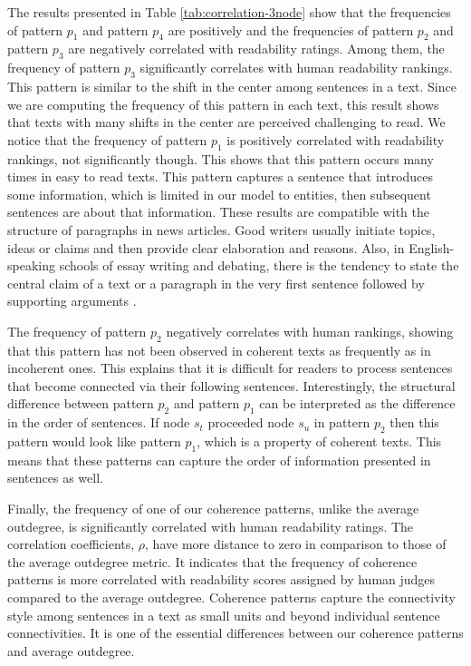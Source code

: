 The results presented in Table \ref{tab:correlation-3node} show that the frequencies of pattern $p_1$ and pattern $p_4$ are positively and the frequencies of pattern $p_2$ and pattern $p_3$ are negatively correlated with readability ratings. 
Among them, the frequency of pattern $p_3$ significantly correlates with human readability rankings. 
This pattern is similar to the shift in the center among sentences in a text. 
Since we are computing the frequency of this pattern in each text, this result shows that texts with many shifts in the center are perceived challenging to read. 
We notice that the frequency of pattern $p_1$ is positively correlated with readability rankings, not significantly though. 
This shows that this pattern occurs many times in easy to read texts.  
This pattern captures a sentence that introduces some information, which is limited in our model to entities, then subsequent sentences are about that information. 
These results are compatible with the structure of paragraphs in news articles. 
Good writers usually initiate topics, ideas or claims and then provide clear elaboration and reasons. 
Also, in English-speaking schools of essay writing and debating, there is the tendency to state the central claim of a text or a paragraph in the very first sentence followed by supporting arguments \cite{peldszus15}. 

The frequency of pattern $p_2$ negatively correlates with human rankings, showing that this pattern has not been observed in coherent texts as frequently as in incoherent ones. 
This explains that it is difficult for readers to process sentences that become connected via their following sentences.  
Interestingly, the structural difference between pattern $p_2$ and pattern $p_1$ can be interpreted as the difference in the order of sentences. 
If node $s_t$ proceeded node $s_u$ in pattern $p_2$ then this pattern would look like pattern $p_1$, which is a property of coherent texts. 
This means that these patterns can capture the order of information presented in sentences as well. 

Finally, the frequency of one of our coherence patterns, unlike the average outdegree, is significantly correlated with human readability ratings. 
The correlation coefficients, $\rho$, have more distance to zero in comparison to those of the average outdegree metric. 
It indicates that the frequency of coherence patterns is more correlated with readability scores assigned by human judges compared to the average outdegree.  
Coherence patterns capture the connectivity style among sentences in a text as small units and beyond individual sentence connectivities.
It is one of the essential differences between our coherence patterns and average outdegree. 

